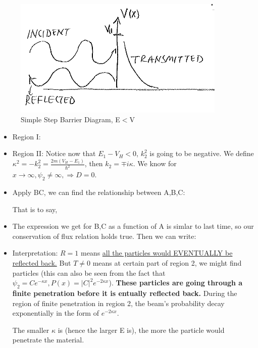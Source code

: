 \documentclass{school-22.101-notes}
\begin{document}
\begin{figure}[h!]
    \centering
    \includegraphics[width=4in]{images/qm/step-barrier-caseB.png}
    \caption{Simple Step Barrier Diagram, E$<$V}
\end{figure}

\begin{itemize}
\item Region I: 

\item Region II:
Notice now that $E_1 - V_H < 0$, $k_2^2$ is going to be negative. We define $\kappa^2 = - k_2^2 = \frac{2 m (V_H - E_1)}{\hbar^2}$, then $k_2 = \mp i \kappa$.
We know for $x \to \infty, \psi_2 \neq \infty, \Rightarrow D = 0$. 

\item Apply BC, we can find the relationship between A,B,C:

That is to say,

\item The expression we get for B,C as a function of A is simlar to last time, so our conservation of flux relation holds true. Then we can write: 


\item Interpretation: $R = 1$ means \uline{all the particles would EVENTUALLY be reflected back.} But $T \neq 0$ means at certain part of region 2, we might find particles (this can also be seen from the fact that $\psi_2 = C e^{-\kappa x}, P(x) = |C|^2 e^{-2 \kappa x}$). \textbf{These particles are going through a finite penetration before it is entually reflected back.} During the region of finite penetration in region 2, the beam's probability decay exponentially in the form of $e^{-2\kappa x}$. 

The smaller $\kappa$ is (hence the larger E is), the more the particle would penetrate the material. 
\end{itemize}
\end{document}
